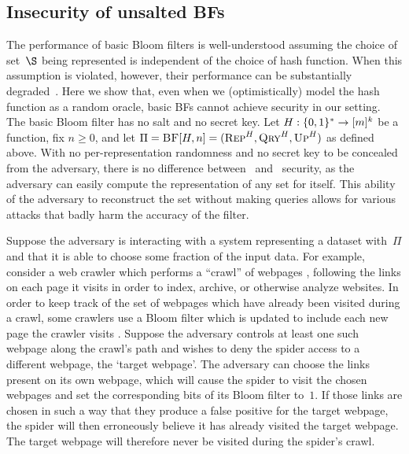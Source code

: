 \subsection{Insecurity of unsalted BFs}
The performance of basic Bloom filters is well-understood assuming the choice of
set~$\S$ being represented is independent of the choice of hash function. When
this assumption is violated, however, their performance can be substantially
degraded~\cite{gerbet2015power}.
%
Here we show that, even when we (optimistically) model the hash function as a
random oracle, basic BFs cannot achieve security in our setting.
%
The basic Bloom filter has no salt and no secret key.
Let $H:\{0,1\}^*\to[m]^k$ be a function, fix $n\geq0$, and let
$\Pi = \textnormal{\textsc{BF}}[H,n]=(\textnormal{\textsc{Rep}}^H,\textnormal{\textsc{Qry}}^H,\textnormal{\textsc{Up}}^H)$ as defined above.
%
With no per-representation randomness and no secret key to be concealed from the
adversary, there is no difference between \errep\ and \erreps\ security, as the
adversary can easily compute the representation of any set for itself. This
ability of the adversary to reconstruct the set without making queries allows
for various attacks that badly harm the accuracy of the filter.

Suppose the adversary is interacting with a system representing a dataset
with~$\Pi$ and that it is able to choose some fraction of the input data.  For
example, consider a web crawler which performs a ``crawl'' of webpages
, following
the links on each page it visits in order to index, archive, or otherwise
analyze websites. In order to keep track of the set of webpages which have
already been visited during a crawl, some crawlers use a Bloom filter which is
updated to include each new page the crawler visits .
Suppose the adversary controls at least one such webpage along the crawl's path
and wishes to deny the spider access to a different webpage, the `target
webpage'. The adversary can choose the links present on its own webpage, which
will cause the spider to visit the chosen webpages and set the corresponding
bits of its Bloom filter to~$1$. If those links are chosen in such a way that they
produce a false positive for the target webpage, the spider will then
erroneously believe it has already visited the target webpage. The target
webpage will therefore never be visited during the spider's crawl.
%

